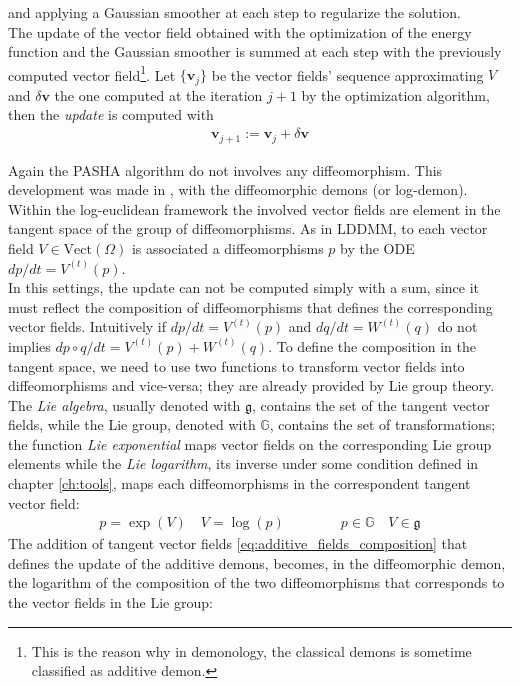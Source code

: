 and applying a Gaussian smoother at each step to regularize the solution.\\
The update of the vector field obtained with the optimization of the energy function and the Gaussian smoother is summed at each step with the previously computed vector field\footnote{This is the reason why in demonology, the classical demons is sometime classified as additive demon.}. Let $\{ \mathbf{v}_{j} \}$ be the vector fields' sequence approximating $V$ and $\delta\mathbf{v}$ the one computed at the iteration $j+1$ by the optimization algorithm, then the \emph{update} is computed with
\begin{align}\label{eq:additive_fields_composition}
\mathbf{v}_{j+1} := \mathbf{v}_{j} + \delta\mathbf{v}
\end{align}

Again the PASHA algorithm do not involves any diffeomorphism. This development was made in \cite{vercauteren2006robust}, with the diffeomorphic demons (or log-demon). 
Within the log-euclidean framework the involved vector fields are element in the tangent space of the group of diffeomorphisms. As in LDDMM, to each vector field $V \in \text{Vect}(\Omega)$ is associated a diffeomorphisms $p$ by the ODE $dp/dt = V^{(t)}(p) $.\\
In this settings, the update can not be computed simply with a sum, since it must reflect the composition of diffeomorphisms that defines the corresponding vector fields. Intuitively if $dp/dt = V^{(t)}(p) $ and $dq/dt = W^{(t)}(q) $ do not implies $dp\circ q/dt = V^{(t)}(p) + W^{(t)}(q) $.
To define the composition in the tangent space, we need to use two functions to transform vector fields into diffeomorphisms and vice-versa; they are already provided by Lie group theory. The \emph{Lie algebra}, usually denoted with $\mathfrak{g}$, contains the set of the tangent vector fields, while the Lie group, denoted with $\mathbb{G}$, contains the set of transformations; the function \emph{Lie exponential} maps vector fields on the corresponding Lie group elements while the \emph{Lie logarithm}, its inverse under some condition defined in chapter \ref{ch:tools}, maps each diffeomorphisms in the correspondent tangent vector field:
\begin{align*}
p = \exp(V)  
\quad
V = \log(p) 
\qquad \qquad
p \in \mathbb{G}
\quad
V \in \mathfrak{g}
\end{align*}
The addition of tangent vector fields \ref{eq:additive_fields_composition} that defines the update of the additive demons, becomes, in the diffeomorphic demon, the logarithm of the composition of the two diffeomorphisms that corresponds to the vector fields in the Lie group:
